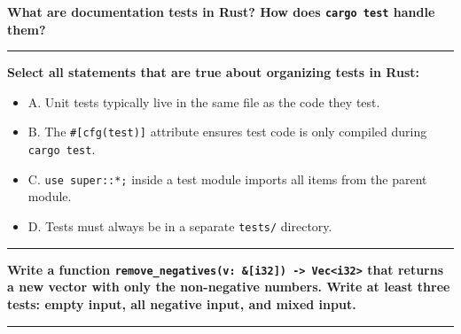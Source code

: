 \documentclass[
  11pt,
]{article}
\newenvironment{Shaded}{}{}
\providecommand{\tightlist}{%
  \setlength{\itemsep}{0pt}\setlength{\parskip}{0pt}}
\begin{document}
\textbf{What are documentation tests in Rust? How does
\texttt{cargo\ test} handle them?}

\begin{center}\rule{0.5\linewidth}{0.5pt}\end{center}

\textbf{Select all statements that are true about organizing tests in
Rust:}

\begin{itemize}
\tightlist
\item[$\square$]
  A. Unit tests typically live in the same file as the code they test.
\item[$\square$]
  B. The \texttt{\#{[}cfg(test){]}} attribute ensures test code is only
  compiled during \texttt{cargo\ test}.
\item[$\square$]
  C. \texttt{use\ super::*;} inside a test module imports all items from
  the parent module.
\item[$\square$]
  D. Tests must always be in a separate \texttt{tests/} directory.
\end{itemize}

\begin{center}\rule{0.5\linewidth}{0.5pt}\end{center}

\textbf{Write a function
\texttt{remove\_negatives(v:\ \&{[}i32{]})\ -\textgreater{}\ Vec\textless{}i32\textgreater{}}
that returns a new vector with only the non-negative numbers. Write at
least three tests: empty input, all negative input, and mixed input.}

\begin{Shaded}
\begin{Highlighting}[]

\end{Highlighting}
\end{Shaded}

\begin{center}\rule{0.5\linewidth}{0.5pt}\end{center}
\end{document}
